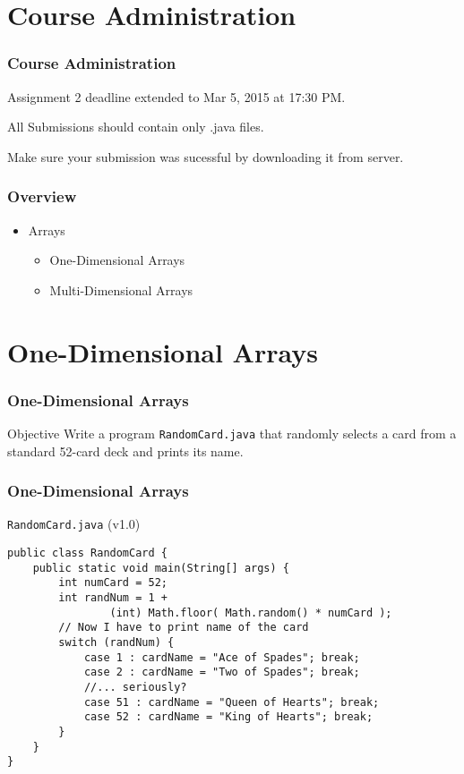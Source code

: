 \documentclass[10pt, compress]{beamer}
\begin{document}
\prepareCover

\section{Course Administration}

\begin{frame}[fragile]
\frametitle{Course Administration}
	Assignment 2 deadline extended to Mar 5, 2015 at 17:30 PM.

	All Submissions should contain only .java files.

	Make sure your submission was sucessful by downloading it from server.
\end{frame}

\begin{frame}[fragile]
	\frametitle{Overview}
	\begin{itemize}
		\item[] Arrays
			\begin{itemize}
				\item[] One-Dimensional Arrays
				\item[] Multi-Dimensional Arrays
			\end{itemize}
	\end{itemize}
\end{frame}


\section{One-Dimensional Arrays}

\begin{frame}[fragile]
	\frametitle{One-Dimensional Arrays}
	\begin{block}{Objective}
		Write a program \texttt{RandomCard.java} that randomly selects a card from a standard 52-card deck and prints its name.
	\end{block}
\end{frame}

\begin{frame}[fragile]
	\frametitle{One-Dimensional Arrays}
	\begin{block}{\texttt{RandomCard.java} (v1.0)}
		\begin{verbatim}
public class RandomCard {
	public static void main(String[] args) {
		int numCard = 52;
		int randNum = 1 +
				(int) Math.floor( Math.random() * numCard );
		// Now I have to print name of the card
		switch (randNum) {
			case 1 : cardName = "Ace of Spades"; break;
			case 2 : cardName = "Two of Spades"; break;
			//... seriously?
			case 51 : cardName = "Queen of Hearts"; break;
			case 52 : cardName = "King of Hearts"; break;
		}
	}
}
		\end{verbatim}
	\end{block}
\end{frame}
\end{document}
